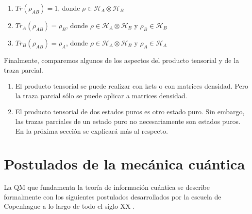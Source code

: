 \begin{enumerate}
    \item $Tr(\rho_{A B}) = 1$, donde $\rho \in \mathcal{H}_A \otimes \mathcal{H}_B$
    \item $Tr_A(\rho_{A B}) = \rho_B$, donde $\rho \in \mathcal{H}_A \otimes \mathcal{H}_B$ y $\rho_B \in \mathcal{H}_B$
    \item $Tr_B(\rho_{A B}) = \rho_A$, donde $\rho \in \mathcal{H}_A \otimes \mathcal{H}_B$ y $\rho_A \in \mathcal{H}_A$
\end{enumerate}

Finalmente, comparemos algunos de los aspectos del producto tensorial y de la traza parcial.

\begin{enumerate}
    \item El producto tensorial se puede realizar con kets o con matrices densidad. Pero la traza parcial sólo se puede aplicar a matrices densidad.
    \item El producto tensorial de dos estados puros es otro estado puro. Sin embargo, las trazas parciales de un estado puro no necesariamente son estados puros. En la próxima sección se explicará más al respecto.
\end{enumerate}

\section{Postulados de la mecánica cuántica}

La QM que fundamenta la teoría de información cuántica se describe formalmente con los siguientes postulados desarrollados por la escuela de Copenhague a lo largo de todo el siglo XX \cite{Galindo_1990}.

